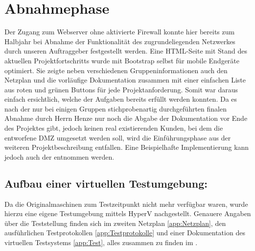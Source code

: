 \section{Abnahmephase} 
\label{sec:Abnahmephase}
Der Zugang zum Webserver ohne aktivierte Firewall konnte hier bereits zum Halbjahr bei Abnahme der Funktionalität des zugrundeliegenden Netzwerkes durch unseren Auftraggeber festgestellt werden. Eine \ac{HTML}-Seite mit Stand des aktuellen Projektfortschritts wurde mit Bootstrap selbst für mobile Endgeräte optimiert. Sie zeigte neben verschiedenen Gruppeninformationen auch den Netzplan und die vorläufige Dokumentation zusammen mit einer einfachen Liste aus roten und grünen Buttons für jede Projektanforderung. Somit war daraus einfach ersichtlich, welche der Aufgaben bereits erfüllt werden konnten.
Da es nach der nur bei einigen Gruppen stichprobenartig durchgeführten finalen Abnahme durch Herrn Henze nur noch die Abgabe der Dokumentation vor Ende des Projektes gibt, jedoch keinen real existierenden Kunden, bei dem die entworfene \ac{DMZ} umgesetzt werden soll, wird die Einführungsphase aus der weiteren Projektbeschreibung entfallen. Eine Beispielhafte Implementierung kann jedoch auch der  entnommen werden.

\subsection*{Aufbau einer virtuellen Testumgebung: } Da die Originalmaschinen zum Testzeitpunkt nicht mehr verfügbar waren, wurde hierzu eine eigene Testumgebung mittels HyperV nachgestellt. Genauere Angaben über die Teststellung finden sich im zweiten Netzplan \ref{app:Netzplan}, den ausführlichen Testprotokollen \ref{app:Testprotokolle} und einer Dokumentation des virtuellen Testsystems \ref{app:Test}, alles zusammen zu finden im .

